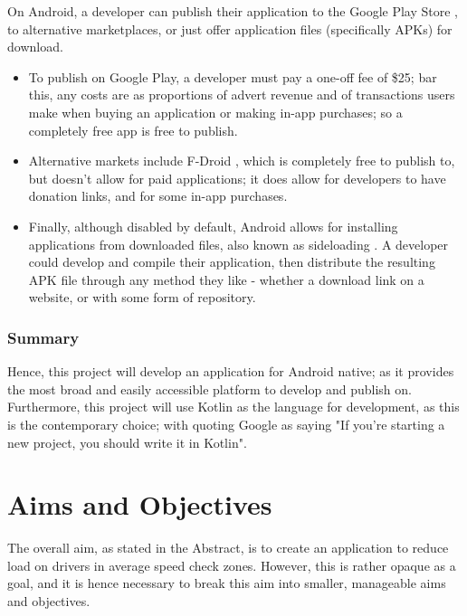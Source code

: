 \documentclass[11pt, a4paper, notitlepage]{report}
\begin{document}
On Android, a developer can publish their application to the Google Play Store \citep{googlePlay}, to alternative marketplaces, or just offer application files (specifically APKs) for download.
\begin{itemize}
	\item To publish on Google Play, a developer must pay a one-off fee of \$25; bar this, any costs are as proportions of advert revenue and of transactions users make when buying an application or making in-app purchases; so a completely free app is free to publish.
	\item Alternative markets include F-Droid \citep{FDroid}, which is completely free to publish to, but doesn't allow for paid applications; it does allow for developers to have donation links, and for some in-app purchases.
	\item Finally, although disabled by default, Android allows for installing applications from downloaded files, also known as sideloading \citep{sideloading}. A developer could develop and compile their application, then distribute the resulting APK file through any method they like - whether a download link on a website, or with some form of repository.
\end{itemize}

\subsection{Summary}
Hence, this project will develop an application for Android native; as it provides the most broad and easily accessible platform to develop and publish on. Furthermore, this project will use Kotlin as the language for development, as this is the contemporary choice; with \citet{KotlinFirst} quoting Google as saying "If you’re starting a new project, you should write it in Kotlin".

\chapter{Aims and Objectives}\label{ch:AnO}
The overall aim, as stated in the Abstract, is to create an application to reduce load on drivers in average speed check zones. However, this is rather opaque as a goal, and it is hence necessary to break this aim into smaller, manageable aims and objectives.
\end{document}
